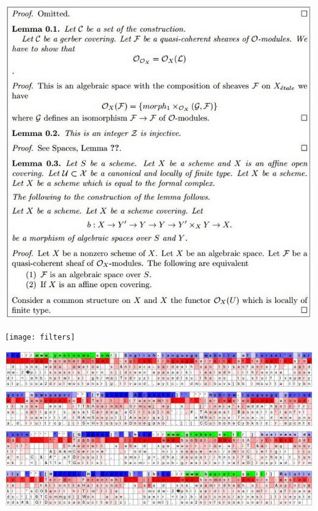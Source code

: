 \documentclass{beamer}
\begin{document}
\begin{frame}

\includegraphics[width=\textwidth]{../latex3}
\end{frame}


\begin{frame}
  \begin{center}
    \texttt{[image: filters]}
  \end{center}
\end{frame}


\begin{frame}
  \begin{center}
    \includegraphics[width=\textwidth]{lstm1}
  \end{center}
\end{frame}
\end{document}
